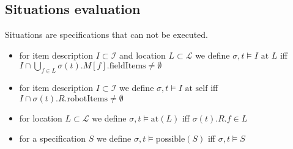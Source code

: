 \documentclass{article}
\newcommand{\robotItems}[1]{\sigma({#1}).R.\text{robotItems}}
\begin{document}
\subsection*{Situations evaluation}
Situations are specifications that can not be executed.
\begin{itemize}
\item for item description $I \subset \mathcal{I}$ and location $L \subset \mathcal{L}$ we define $\sigma, t \models I \text{ at } L$ iff $I \cap \bigcup\limits_{f \in L}\sigma(t).M[f].\text{fieldItems} \neq \emptyset$
\item for item description $I \subset \mathcal{I}$  we define $\sigma, t \models I \text{ at self}$ iff $I \cap \robotItems{t} \neq \emptyset$
\item for location $L \subset \mathcal{L}$ we define $\sigma, t \models \text{at}(L)$ iff $\sigma(t).R.f \in L$
\item for a specification $S$ we define $\sigma, t \models \text{possible}(S)$ iff $\sigma, t \models S$
\end{itemize}
\end{document}
